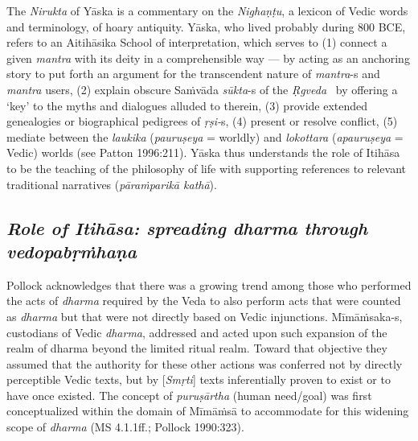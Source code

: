 The \textit{Nirukta} of Yāska is a commentary on the \textit{Nighaṇṭu}, a lexicon of Vedic words and terminology, of hoary antiquity. Yāska, who lived probably during 800 BCE, refers to an Aitihāsika School of interpretation, which serves to (1) connect a given \textit{mantra} with its deity in a comprehensible way — by acting as an anchoring story to put forth an argument for the transcendent nature of \textit{mantra}-s and \textit{mantra} users, (2) explain obscure Saṁvāda \textit{sūkta}-s of the \textit{Ṛgveda}  by offering a ‘key’ to the myths and dialogues alluded to therein, (3) provide extended genealogies or biographical pedigrees of \textit{ṛṣi-}s, (4) present or resolve conflict, (5) mediate between the \textit{laukika} (\textit{pauruṣeya} = worldly) and \textit{lokottara} (\textit{apauruṣeya} = Vedic) worlds (see Patton 1996:211). Yāska thus understands the role of Itihāsa to be the teaching of the philosophy of life with supporting references to relevant traditional narratives (\textit{pāraṁparikā kathā}).


\subsection*{\textit{Role of Itihāsa: spreading dharma through vedopabṛṁhaṇa}}

Pollock acknowledges that there was a growing trend among those who performed the acts of \textit{dharma} required by the Veda to also perform acts that were counted as \textit{dharma} but that were not directly based on Vedic injunctions. Mīmāṁsaka-s, custodians of Vedic \textit{dharma}, addressed and acted upon such expansion of the realm of dharma beyond the limited ritual realm. Toward that objective they assumed that the authority for these other actions was conferred not by directly perceptible Vedic texts, but by [\textit{Smṛti}] texts inferentially proven to exist or to have once existed. The concept of \textit{puruṣārtha} (human need/goal) was first conceptualized within the domain of Mīmāṁsā to accommodate for this widening scope of \textit{dharma} (MS 4.1.1ff.; Pollock 1990:323).


